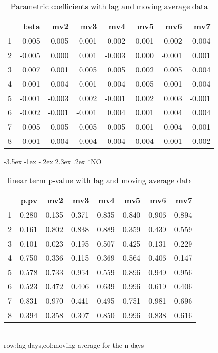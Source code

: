 \documentclass[a4paper, 12pt]{article}
\makeatletter
\def\large{\fontsize{14}{20}\selectfont}
\renewcommand\subsection{\@startsection {subsection}{1}{\z@}%
                                   {-3.5ex \@plus -1ex \@minus -.2ex}%
                                   {2.3ex \@plus.2ex}%
                                   {\centering\normalfont\large\bfseries}}
\makeatother
\begin{document}
\begin{table}[h]
\centering
\caption{Parametric coefficients with lag and moving average data}
\begin{tabular}{rrrrrrrr}
  \hline
 & beta & mv2 & mv3 & mv4 & mv5 & mv6 & mv7 \\
  \hline
1 & 0.005 & 0.005 & -0.001 & 0.002 & 0.001 & 0.002 & 0.004 \\
  2 & -0.005 & 0.000 & 0.001 & -0.003 & 0.000 & -0.001 & 0.001 \\
  3 & 0.007 & 0.001 & 0.005 & 0.005 & 0.002 & 0.005 & 0.004 \\
  4 & -0.001 & 0.004 & 0.001 & 0.004 & 0.005 & 0.001 & 0.004 \\
  5 & -0.001 & -0.003 & 0.002 & -0.001 & 0.002 & 0.003 & -0.001 \\
  6 & -0.002 & -0.001 & -0.001 & 0.004 & 0.001 & 0.004 & 0.004 \\
  7 & -0.005 & -0.005 & -0.005 & -0.005 & -0.001 & -0.004 & -0.001 \\
  8 & 0.001 & -0.004 & -0.004 & -0.004 & -0.004 & 0.001 & -0.002 \\
   \hline
\end{tabular}
\end{table}
\clearpage
\subsection*{NO}
\begin{table}[h]
\centering
\caption{linear term p-value with lag and moving average data}
\begin{tabular}{rrrrrrrr}
  \hline
 & p.pv & mv2 & mv3 & mv4 & mv5 & mv6 & mv7 \\
  \hline
1 & 0.280 & 0.135 & 0.371 & 0.835 & 0.840 & 0.906 & 0.894 \\
  2 & 0.161 & 0.802 & 0.838 & 0.889 & 0.359 & 0.439 & 0.559 \\
  3 & 0.101 & 0.023 & 0.195 & 0.507 & 0.425 & 0.131 & 0.229 \\
  4 & 0.750 & 0.336 & 0.115 & 0.369 & 0.564 & 0.406 & 0.147 \\
  5 & 0.578 & 0.733 & 0.964 & 0.559 & 0.896 & 0.949 & 0.956 \\
  6 & 0.523 & 0.472 & 0.406 & 0.639 & 0.996 & 0.619 & 0.406 \\
  7 & 0.831 & 0.970 & 0.441 & 0.495 & 0.751 & 0.981 & 0.696 \\
  8 & 0.394 & 0.358 & 0.307 & 0.850 & 0.996 & 0.838 & 0.616 \\
   \hline
\end{tabular}
\\row:lag days,col:moving average for the n days
\end{table}
\end{document}

